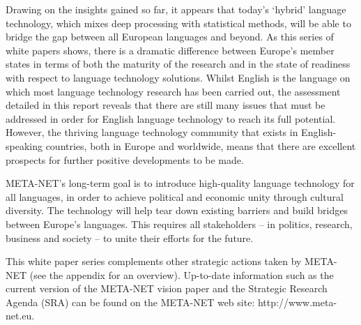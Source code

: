 \begin{multicols}{2}
Drawing on the insights gained so far, it appears that today’s `hybrid' language technology, which mixes deep processing with statistical methods, will be able to bridge the gap between all European languages and beyond. As this series of white papers shows, there is a dramatic difference between Europe’s member states in terms of both the maturity of the research and in the state of readiness with respect to language technology solutions.  Whilst English is the language on which most language technology research has been carried out, the assessment detailed in this report reveals that there are still many issues that must be addressed in order for English language technology to reach its full potential. However, the thriving language technology community that exists in English-speaking countries, both in Europe and worldwide, means that there are excellent prospects for further positive developments to be made.

META-NET’s long-term goal is to introduce high-quality language technology for all languages, in order to achieve political and economic unity through cultural diversity. The technology will help tear down existing barriers and build bridges between Europe’s languages. This requires all stakeholders -- in politics, research, business and society -- to unite their efforts for the future.

This white paper series complements other strategic actions taken by META-NET (see the appendix for an overview). Up-to-date information such as the current version of the META-NET vision paper \cite{Meta1} and the Strategic Research Agenda (SRA) can be found on the META-NET web site: http://www.meta-net.eu.  
\end{multicols}

\clearpage


